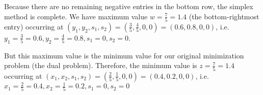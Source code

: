 \documentclass[11pt,letterpaper]{article}
\begin{document}
Because there are no remaining negative entries in the bottom row, the simplex method is complete. We have maximum value $w= \frac{7}{5}= 1.4$ (the bottom-rightmost entry) occurring at $(y_1, y_2, s_1, s_2)= (\frac{3}{5}, \frac{4}{5}, 0, 0)= (0.6, 0.8, 0, 0)$, i.e. $y_1= \frac{3}{5}= 0.6, y_2= \frac{4}{5}= 0.8, s_1= 0, s_2= 0$. \pspace

But this maximum value is the minimum value for our original minimization problem (the dual problem). Therefore, the minimum value is $z= \frac{7}{5}= 1.4$ occurring at $(x_1, x_2, s_1, s_2)= (\frac{2}{5}, \frac{1}{5}, 0, 0)= (0.4, 0.2, 0, 0)$, i.e. $x_1= \frac{2}{5}= 0.4, x_2= \frac{1}{5}= 0.2, s_1= 0, s_2= 0$
\end{document}
